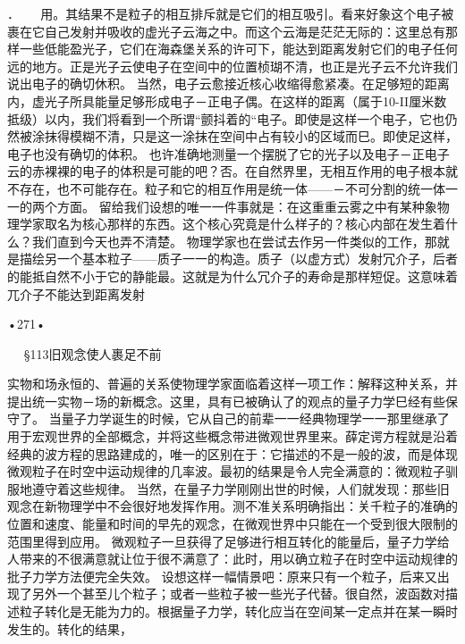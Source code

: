 ．
  
用。其结果不是粒子的相互排斥就是它们的相互吸引。看来好象这个电子被裹在它自己发射并吸收的虚光子云海之中。而这个云海是茫茫无际的：这里总有那样一些低能盈光子，它们在海森堡关系的许可下，能达到距离发射它们的电子任何远的地方。正是光子云使电子在空间中的位置桢瑚不清，也正是光子云不允许我们说出电子的确切休积。
当然，电子云愈接近核心收缩得愈紧凑。在足够短的距离内，虚光子所具能量足够形成电子－正电子偶。在这样的距离（属于10-II厘米数抵级）以内，我们将看到一个所谓“颤抖着的“电子。即使是这样一个电子，它也仍然被涂抹得模糊不清，只是这一涂抹在空间中占有较小的区域而巳。即使足这样，电子也没有确切的体积。
也许准确地测量一个摆脱了它的光子以及电子－正电子云的赤裸裸的电子的体积是可能的吧？否。在自然界里，无相互作用的电子根本就不存在，也不可能存在。粒子和它的相互作用是统一体——－不可分割的统一体一一的两个方面。
留给我们设想的唯一一件事就是：在这重重云雾之中有某种象物理学家取名为核心那样的东西。这个核心究竟是什么样子的？核心内部在发生着什么？我们直到今天也弄不清楚。
物理学家也在尝试去作另一件类似的工作，那就是描绘另一个基本粒子——质子一一的构造。质子（以虚方式）发射冗介子，后者的能抵自然不小于它的静能最。这就是为什么冗介子的寿命是那样短促。这意味着兀介子不能达到距离发射

•271•
  




  
§113旧观念使人裹足不前

实物和场永恒的、普遍的关系使物理学家面临着这样一项工作：解释这种关系，并提出统一实物－场的新概念。这里，具有已被确认了的观点的量子力学巳经有些保守了。
当量子力学诞生的时候，它从自己的前辈一一经典物理学一一那里继承了用于宏观世界的全部概念，并将这些概念带进微观世界里来。薛定谔方程就是沿着经典的波方程的思路建成的，唯一的区别在于：它描述的不是一般的波，而是体现微观粒子在时空中运动规律的几率波。最初的结果是令人完全满意的：微观粒子驯服地遵守着这些规律。
当然，在量子力学刚刚出世的时候，人们就发现：那些旧观念在新物理学中不会很好地发挥作用。测不准关系明确指出：关千粒子的准确的位置和速度、能量和时间的早先的观念，在微观世界中只能在一个受到很大限制的范围里得到应用。
微观粒子一旦获得了足够进行相互转化的能量后，量子力学给人带来的不很满意就让位于很不满意了：此时，用以确立粒子在时空中运动规律的批子力学方法便完全失效。
设想这样一幅情景吧：原来只有一个粒子，后来又出现了另外一个甚至儿个粒子；或者一些粒子被一些光子代替。很自然，波函数对描述粒子转化是无能为力的。根据量子力学，转化应当在空间某一定点并在某一瞬时发生的。转化的结果，

